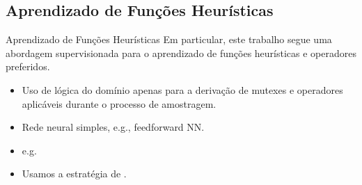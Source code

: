 \documentclass{beamer}
\begin{document}
\subsection{Aprendizado de Funções Heurísticas}

\begin{frame}{Aprendizado de Funções Heurísticas}
Em particular, este trabalho segue uma \alert{abordagem supervisionada} para o aprendizado de funções heurísticas e operadores preferidos.
\begin{itemize}
  \pause
  \item Uso de lógica do domínio apenas para a derivação de mutexes e operadores aplicáveis durante o processo de amostragem.
  \pause
  \item Rede neural simples, e.g., feedforward NN.
  \pause
  \item e.g.~\cite{Ferber.etal/2020a,Yu.etal/2020,Ferber.etal/2022,OToole/2022,Bettker.etal/2022}
  \pause
  \item Usamos a estratégia de \alert{\cite{Bettker.etal/2022}}.
\end{itemize}
\end{frame}
\end{document}
